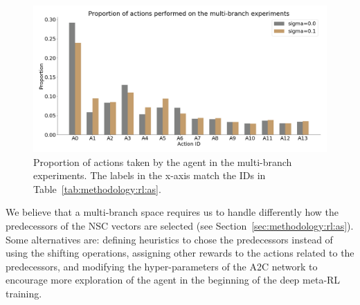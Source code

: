 \begin{figure}[ht]
\centering
    \includegraphics[width=0.65\linewidth]{imgs/multibranch/actions-dist-mb.png}
\caption{Proportion of actions taken by the agent in the multi-branch experiments. The labels in the x-axis match the IDs in Table~\ref{tab:methodology:rl:as}.}
\label{fig:results:exp3:actions}
\end{figure}

We believe that a multi-branch space requires us to handle differently how the predecessors of the NSC vectors are selected (see Section~\ref{sec:methodology:rl:as}). Some alternatives are: defining heuristics to chose the predecessors instead of using the shifting operations, assigning other rewards to the actions related to the predecessors, and modifying the hyper-parameters of the A2C network to encourage more exploration of the agent in the beginning of the deep meta-RL training.
